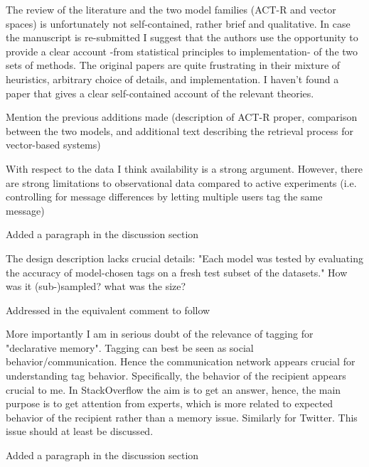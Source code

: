 \documentclass[answers,12pt]{exam}
\begin{document}
\begin{questions}
\question The review of the literature and the two model families (ACT-R and vector spaces) is unfortunately not self-contained, rather brief and qualitative. In case the manuscript is re-submitted I suggest that the authors use the opportunity to provide a clear account -from statistical principles to implementation- of the two sets of methods. The original papers are quite frustrating in their mixture of heuristics, arbitrary choice of details, and implementation. I haven't found a paper that gives a clear self-contained account of the relevant theories.

\begin{solution}
Mention the previous additions made (description of ACT-R proper, comparison between the two models, and  additional text describing the retrieval process for vector-based systems)
\end{solution}

\question With respect to the data I think availability is a strong argument. However, there are strong limitations to observational data compared to active experiments (i.e. controlling for message differences by letting multiple users tag the same message)

\begin{solution}
Added a paragraph in the discussion section
\end{solution}

\question The design description lacks crucial details: "Each model was tested by evaluating the accuracy of model-chosen tags on a fresh test subset of the datasets." How was it (sub-)sampled? what was the size?

\begin{solution}
Addressed in the equivalent comment to follow
\end{solution}

\question More importantly I am in serious doubt of the relevance of tagging for "declarative memory". Tagging can best be seen as social behavior/communication. Hence the communication network appears crucial for understanding tag behavior. Specifically, the behavior of the recipient appears crucial to me. In StackOverflow the aim is to get an answer, hence, the main purpose is to get attention from experts, which is more related to expected behavior of the recipient rather than a memory issue. Similarly for Twitter. This issue should at least be discussed.

\begin{solution}
Added a paragraph in the discussion section
\end{solution}


\end{questions}
\end{document}

